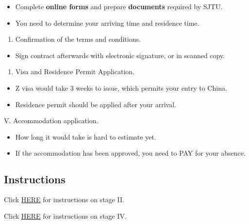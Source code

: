 \documentclass[]{article}
\providecommand{\tightlist}{%
  \setlength{\itemsep}{0pt}\setlength{\parskip}{0pt}}
\begin{document}
\begin{itemize}
\tightlist
\item
  Complete \textbf{online forms} and prepare \textbf{documents} required
  by SJTU.
\item
  You need to determine your arriving time and residence time.
\end{itemize}

\begin{enumerate}
\def\labelenumi{\Roman{enumi}.}
\setcounter{enumi}{2}
\tightlist
\item
  Confirmation of the terms and conditions.
\end{enumerate}

\begin{itemize}
\tightlist
\item
  Sign contract afterwards with electronic signature, or in scanned
  copy.
\end{itemize}

\begin{enumerate}
\def\labelenumi{\Roman{enumi}.}
\setcounter{enumi}{3}
\tightlist
\item
  Visa and Residence Permit Application.
\end{enumerate}

\begin{itemize}
\tightlist
\item
  Z visa would take 3 weeks to issue, which permits your entry to China.
\item
  Residence permit should be applied after your arrival.
\end{itemize}

V. Accommodation application.

\begin{itemize}
\tightlist
\item
  How long it would take is hard to estimate yet.
\item
  If the accommodation has been approved, you need to PAY for your
  absence.
\end{itemize}

\hypertarget{instructions}{%
\subsection{Instructions}\label{instructions}}

Click \href{Instructions_on_stage_2.md}{HERE} for instructions on stage
II.

Click \href{Instructions_on_stage_4.md}{HERE} for instructions on stage
IV.
\end{document}
